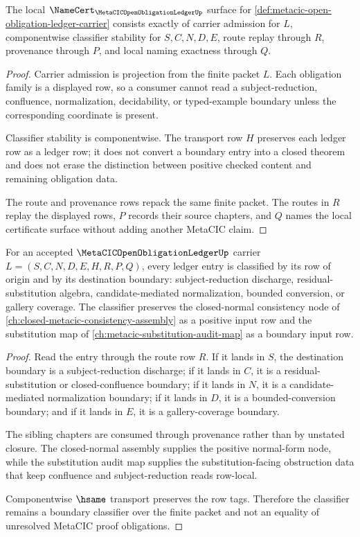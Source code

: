 \begin{theorem}
\label{thm:metacic-open-obligation-ledger-namecert-obligations}
The local $\NameCert_{\MetaCICOpenObligationLedgerUp}$ surface for \autoref{def:metacic-open-obligation-ledger-carrier} consists exactly of carrier admission for $L$, componentwise classifier stability for $S,C,N,D,E$, route replay through $R$, provenance through $P$, and local naming exactness through $Q$.
\end{theorem}
\begin{proof}
Carrier admission is projection from the finite packet $L$. Each obligation family is a displayed row, so a consumer cannot read a subject-reduction, confluence, normalization, decidability, or typed-example boundary unless the corresponding coordinate is present.

Classifier stability is componentwise. The transport row $H$ preserves each ledger row as a ledger row; it does not convert a boundary entry into a closed theorem and does not erase the distinction between positive checked content and remaining obligation data.

The route and provenance rows repack the same finite packet. The routes in $R$ replay the displayed rows, $P$ records their source chapters, and $Q$ names the local certificate surface without adding another MetaCIC claim.
\end{proof}

\begin{theorem}
\label{thm:metacic-open-obligation-ledger-boundary-classifier}
For an accepted $\MetaCICOpenObligationLedgerUp$ carrier $L=(S,C,N,D,E,H,R,P,Q)$, every ledger entry is classified by its row of origin and by its destination boundary: subject-reduction discharge, residual-substitution algebra, candidate-mediated normalization, bounded conversion, or gallery coverage. The classifier preserves the closed-normal consistency node of \autoref{ch:closed-metacic-consistency-assembly} as a positive input row and the substitution map of \autoref{ch:metacic-substitution-audit-map} as a boundary input row.
\end{theorem}
\begin{proof}
Read the entry through the route row $R$. If it lands in $S$, the destination boundary is a subject-reduction discharge; if it lands in $C$, it is a residual-substitution or closed-confluence boundary; if it lands in $N$, it is a candidate-mediated normalization boundary; if it lands in $D$, it is a bounded-conversion boundary; and if it lands in $E$, it is a gallery-coverage boundary.

The sibling chapters are consumed through provenance rather than by unstated closure. The closed-normal assembly supplies the positive normal-form node, while the substitution audit map supplies the substitution-facing obstruction data that keep confluence and subject-reduction reads row-local.

Componentwise $\hsame$ transport preserves the row tags. Therefore the classifier remains a boundary classifier over the finite packet and not an equality of unresolved MetaCIC proof obligations.
\end{proof}

